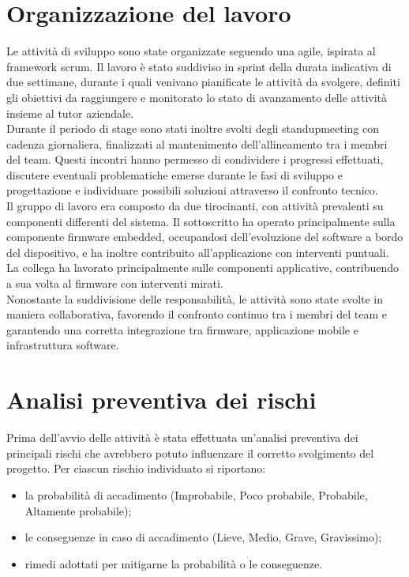 \section{Organizzazione del lavoro}

Le attività di sviluppo sono state organizzate seguendo una \gls{agile}, ispirata al framework
\gls{scrum}. Il lavoro è stato suddiviso in sprint della durata indicativa di due settimane, durante i quali
venivano pianificate le attività da svolgere, definiti gli obiettivi da raggiungere e monitorato lo stato
di avanzamento delle attività insieme al tutor aziendale.
\\
Durante il periodo di stage sono stati inoltre svolti degli \gls{standupmeeting} con cadenza giornaliera,
finalizzati al mantenimento dell'allineamento tra i membri del team. Questi incontri hanno permesso di
condividere i progressi effettuati, discutere eventuali problematiche emerse durante le fasi di sviluppo
e progettazione e individuare possibili soluzioni attraverso il confronto tecnico.
\\
Il gruppo di lavoro era composto da due tirocinanti, con attività prevalenti su componenti differenti 
del sistema. Il sottoscritto ha operato principalmente sulla componente firmware embedded, occupandosi 
dell’evoluzione del software a bordo del dispositivo, e ha inoltre contribuito all’applicazione con 
interventi puntuali. La collega ha lavorato principalmente sulle componenti applicative, contribuendo a 
sua volta al firmware con interventi mirati.
\\
Nonostante la suddivisione delle responsabilità, le attività sono state svolte in maniera collaborativa,
favorendo il confronto continuo tra i membri del team e garantendo una corretta integrazione tra firmware,
applicazione mobile e infrastruttura software.

\section{Analisi preventiva dei rischi}
Prima dell'avvio delle attività è stata effettuata un'analisi preventiva dei principali rischi
che avrebbero potuto influenzare il corretto svolgimento del progetto. Per ciascun rischio
individuato si riportano:
\begin{itemize}
    \item la probabilità di accadimento (Improbabile, Poco probabile, Probabile, Altamente probabile);
    \item le conseguenze in caso di accadimento (Lieve, Medio, Grave, Gravissimo);
    \item rimedi adottati per mitigarne la probabilità o le conseguenze.
\end{itemize}

